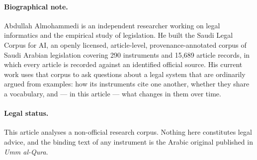 \documentclass[11pt]{article}
\begin{document}
\paragraph{Biographical note.} Abdullah Almohammedi is an independent
researcher working on legal informatics and the empirical study of legislation.
He built the Saudi Legal Corpus for AI, an openly licensed, article-level,
provenance-annotated corpus of Saudi Arabian legislation covering 290
instruments and 15,689 article records, in which every article is recorded
against an identified official source. His current work uses that corpus to
ask questions about a legal system that are ordinarily argued from examples:
how its instruments cite one another, whether they share a vocabulary, and ---
in this article --- what changes in them over time.

\paragraph{Legal status.} This article analyses a non-official research
corpus. Nothing here constitutes legal advice, and the binding text of any
instrument is the Arabic original published in \emph{Umm al-Qura}.
\end{document}
